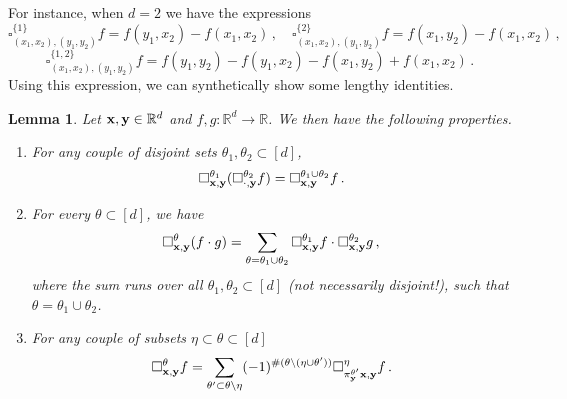 \documentclass[12pt]{article}
\numberwithin{equation}{section}
\theoremstyle{plain}
\newtheorem{lemma}[theorem]{Lemma}
\theoremstyle{definition}
\newcommand{\R}{\ensuremath{{\mathbb R}}}
\def\fy{\mathbf y}\def\fz{\mathbf z}
\begin{document}
For instance, when $d=2$ we have the expressions
\[\square_{(x_1,x_2),(y_1,y_2)}^{\{1\}} f= f(y_1, x_2)- f(x_1,x_2)\,,\quad  \square_{(x_1,x_2),(y_1,y_2)}^{\{2\}} f= f(x_1, y_2)- f(x_1,x_2)\,, \]
\[\square_{(x_1,x_2),(y_1,y_2)}^{\{1,2\}}f= f(y_1, y_2)- f(y_1, x_2)- f(x_1, y_2)+  f(x_1,x_2)\,. \]
Using this expression, we can synthetically show some lengthy identities.

\begin{lemma}\label{lem:splitSquareIncrement}
Let $\fx,\fy\in \R^d$ and $f,g\colon \R^d\to \R$. We then have the following properties.
\begin{enumerate}
    \item For any couple of disjoint sets $\theta_1,\theta_2\subset[d]$,
\begin{equation}\label{eq:compositionOfSquares}
    \square_{\fx,\fy}^{\theta_1}(\square_{\cdot,\fy}^{\theta_2} f )=  \square^{\theta_1\cup\theta_2}_{\fx,\fy} f\,.
\end{equation}
\item For every $\theta\subset[d]$, we have
\begin{equation}\label{eq:productOfSquares}
    \square_{\fx,\fy}^\theta(f\cdot g) = \sum_{\theta = \theta_1\cup\theta_2} \square^{\theta_1}_{\fx,\fy} f\cdot \square_{\fx,\fy}^{\theta_2} g\,,
\end{equation}
    where the sum runs over all $\theta_1,\theta_2\subset[d]$ (not necessarily disjoint!), such that $\theta = \theta_1\cup\theta_2$.
\item  For any couple of subsets $\eta\subset\theta\subset[d]$
\begin{equation}\label{eq:splitUpSquare}
    \square_{\fx,\fy}^\theta f = \sum_{\theta'\subset\theta\setminus\eta}(-1)^{\#(\theta\setminus(\eta\cup\theta'))}\square^\eta_{\pi^{\theta'}_{\fy}\fx,\fy} f\,.
\end{equation}
\end{enumerate}
\end{lemma}
\end{document}
